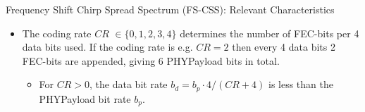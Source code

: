 \begin{frame}{\alert{Frequency Shift} Chirp Spread Spectrum (FS-CSS): Relevant Characteristics}
\begin{itemize}
    \item The \alert{coding rate $CR$} $\in \{0, 1, 2, 3, 4\}$ determines the number of \alert{FEC-bits} per \alert{4 data bits} used. If the coding rate is e.g. $CR = 2$ then every \textcolor{fh-ooe-red}{4} \alert{data bits} \textcolor{fh-ooe-red}{2} \alert{FEC-bits} are appended, giving \textcolor{fh-ooe-red}{6} \alert{PHYPayload bits} in total.
    \begin{itemize}
      \item[$\Rightarrow$] For $CR > 0$, the \alert{data bit rate} $b_d  = b_p \cdot 4 / (CR + 4)$ is less than the \alert{PHYPayload bit rate $b_p$}.
    \end{itemize}
  \end{itemize}
\end{frame}
